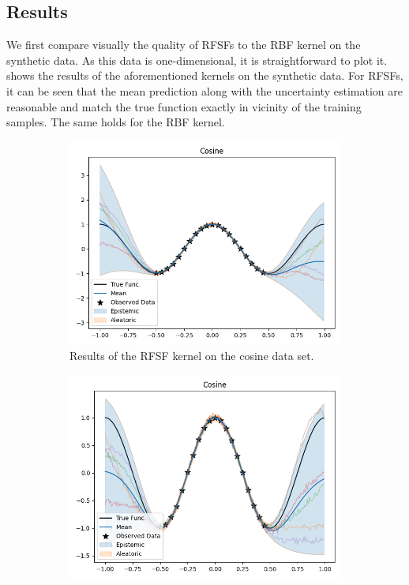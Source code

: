 \subsection{Results}  \label{subsec:results}
We first compare visually the quality of \acp{RFSF} to the \ac{RBF} kernel on the synthetic data.
As this data is one-dimensional, it is straightforward to plot it.
 shows the results of the aforementioned kernels on the synthetic data.
For \acp{RFSF}, it can be seen that the mean prediction along with the uncertainty estimation are reasonable and match the true function exactly in vicinity of the training samples.
The same holds for the \ac{RBF} kernel.



\begin{figure}
    \centering
    \begin{subfigure}{0.49\linewidth}
        \centering
        \includegraphics[width=\linewidth, height=0.618033988749895\linewidth]{graphics/generated/gp-cosine-rfsf.png}  %
        \caption{Results of the \acs{RFSF} kernel on the cosine data set.}
    \end{subfigure}
    \begin{subfigure}{0.49\linewidth}
        \centering
        \includegraphics[width=\linewidth, height=0.618033988749895\linewidth]{graphics/generated/gp-cosine-rbf.png}  %

\end{subfigure}
\end{figure}
